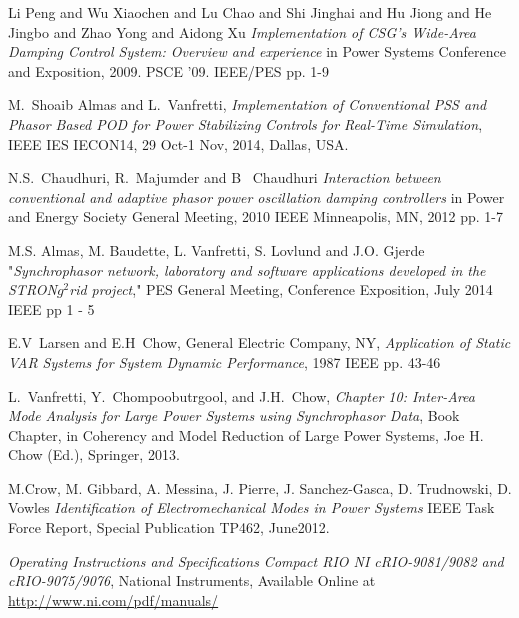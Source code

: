\documentclass[journal]{IEEEtran}
\begin{document}
\begin{thebibliography}{1}
 Li Peng and Wu Xiaochen and Lu Chao and Shi Jinghai and Hu Jiong and He Jingbo and Zhao Yong and Aidong Xu \emph{Implementation of CSG's Wide-Area Damping Control System: Overview and experience} in Power Systems Conference and Exposition, 2009. PSCE '09. IEEE/PES pp. 1-9
  
 M.~Shoaib Almas and L.~Vanfretti, \emph{Implementation of Conventional PSS and Phasor Based POD for Power Stabilizing Controls for Real-Time Simulation}, IEEE IES IECON14, 29 Oct-1 Nov, 2014, Dallas, USA.

 N.S.~Chaudhuri, R.~Majumder and B~ Chaudhuri \emph{Interaction between conventional and adaptive phasor power oscillation damping controllers} in Power and Energy Society General Meeting, 2010 IEEE Minneapolis, MN, 2012 pp. 1-7

 M.S. Almas, M. Baudette, L. Vanfretti, S. Lovlund and J.O. Gjerde "\emph{Synchrophasor network, laboratory and software applications developed in the STRON$g^{2}$rid project}," PES General Meeting, Conference Exposition, July 2014 IEEE pp 1 - 5

 E.V~Larsen and E.H~Chow, General Electric Company, NY, \emph{Application of Static VAR Systems for System Dynamic Performance}, 1987 IEEE pp. 43-46

  L.~Vanfretti, Y.~Chompoobutrgool, and J.H.~Chow, \emph{Chapter 10: Inter-Area Mode Analysis for Large Power Systems using Synchrophasor Data}, Book Chapter, in Coherency and Model Reduction of Large Power Systems, Joe H. Chow (Ed.), Springer, 2013.

 M.Crow, M. Gibbard, A. Messina, J. Pierre, J. Sanchez-Gasca, D. Trudnowski, D. Vowles \emph{Identification of Electromechanical Modes in Power Systems} IEEE Task Force Report, Special Publication TP462, June2012.

 \emph{Operating Instructions and Specifications Compact RIO NI cRIO-9081/9082 and cRIO-9075/9076}, National Instruments, Available Online at \url{http://www.ni.com/pdf/manuals/}
  


\end{thebibliography}
\end{document}
